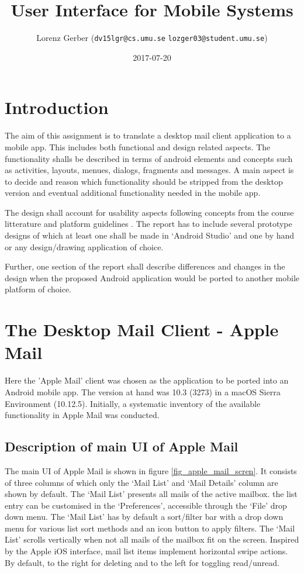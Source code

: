 \documentclass[a4paper,11pt,twoside]{article}
\title{User Interface for Mobile Systems}
\author{Lorenz Gerber ({\tt{dv15lgr@cs.umu.se}} {\tt{lozger03@student.umu.se}})}
\date{2017-07-20}
\begin{document}
\lstset{language=C}
\maketitle
\thispagestyle{empty}
\newpage
\tableofcontents
\thispagestyle{empty}
\newpage

\clearpage
{}

\section{Introduction}
The aim of this assignment is to translate a desktop mail client application to
a mobile app. This includes both functional and design related aspects. The
functionality shalls be described in terms of android elements and concepts such
as activities, layouts, menues, dialogs, fragments and messages. A main aspect is
to decide and reason which functionality should be stripped from the desktop version
and eventual additional functionality needed in the mobile app.

The design shall account for usability aspects following concepts from the
course litterature \cite{clark2015} and platform guidelines \cite{materialdesign}.
The report has to include several prototype designs of which at least one shall be
made in `Android Studio' and one by hand or any design/drawing application of choice.

Further, one section of the report shall describe differences and changes in the
design when the proposed Android application would be ported to another mobile
platform of choice.

\section{The Desktop Mail Client - Apple Mail}
Here the 'Apple Mail' client was chosen as the application to be ported into
an Android mobile app. The version at hand was 10.3 (3273) in a macOS Sierra
Environment (10.12.5). Initially, a systematic inventory of the available
functionality in Apple Mail was conducted.

\subsection{Description of main UI of Apple Mail}
The main UI of Apple Mail is shown in figure \ref{fig_apple_mail_scren}.
It consists of three columns of which only the `Mail List' and `Mail Details'
column are shown by default. The `Mail List' presents all mails of the active mailbox.
the list entry can be customised in the `Preferences', accessible through the `File'
drop down menu. The `Mail List' has by default a sort/filter bar with a drop down
menu for various list sort methods and an icon button to apply filters. The `Mail
List' scrolls vertically when not all mails of the mailbox fit on the screen.
Inspired by the Apple iOS interface, mail list items implement horizontal swipe
actions. By default, to the right for deleting and to the left for toggling
read/unread.
\end{document}

